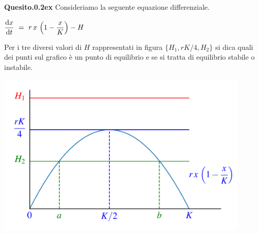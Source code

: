 \documentclass[12pt,twoside,a4paper]{article}
\newenvironment{question}{\par\bigskip\textbf{Quesito.\kern0.2ex}}{\vspace{\parskip}}
\begin{document}
\begin{question}
Consideriamo la seguente equazione differenziale. 

\hfil$\displaystyle\frac{{\rm d}x}{{\rm d}t}\ =\ r\,x\,\left(1-\frac{x}{K}\right) - H$

Per i tre diversi valori di $H$ rappresentati in figura $\{H_1, rK/4, H_2\}$ si dica quali dei punti sul grafico è un punto di equilibrio e se si tratta di equilibrio stabile o instabile.


\hfil\includegraphics[width=0.9\textwidth]{harvest.pdf}
\end{question}
\end{document}
